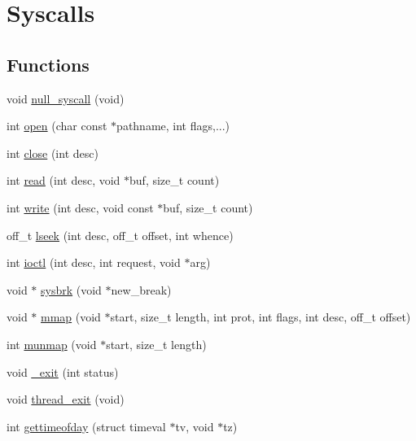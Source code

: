 \hypertarget{group__syscalls}{
\section{Syscalls}
\label{group__syscalls}
}
\subsection*{Functions}
\begin{DoxyCompactItemize}
\item 
void \hyperlink{group__syscalls_ga4430741655c04cf7d609fd935f52a28a}{null\_\-syscall} (void)
\item 
int \hyperlink{group__syscalls_ga0bc065c5cd7178fb88c67a4d02f61deb}{open} (char const $\ast$pathname, int flags,...)
\item 
int \hyperlink{group__syscalls_gab919bda3c5fc0afcf6e3417b840da6e9}{close} (int desc)
\item 
int \hyperlink{group__syscalls_ga709fa54ec765f9f1702f48b43d875a08}{read} (int desc, void $\ast$buf, size\_\-t count)
\item 
int \hyperlink{group__syscalls_ga3b0897fd20782dd7792b88d189e9d4df}{write} (int desc, void const $\ast$buf, size\_\-t count)
\item 
off\_\-t \hyperlink{group__syscalls_gab953b420ed5fc8595d05e52d5bc5a474}{lseek} (int desc, off\_\-t offset, int whence)
\item 
int \hyperlink{group__syscalls_ga546661554019fd9554cf4526305c24fd}{ioctl} (int desc, int request, void $\ast$arg)
\item 
void $\ast$ \hyperlink{group__syscalls_gafdb60e6e9d2dd663e3cc8a13ef796877}{sysbrk} (void $\ast$new\_\-break)
\item 
void $\ast$ \hyperlink{group__syscalls_ga8937a334d42232a0804ed450bb3b8e27}{mmap} (void $\ast$start, size\_\-t length, int prot, int flags, int desc, off\_\-t offset)
\item 
int \hyperlink{group__syscalls_ga559e66a4492a6cb9c6ef5cd07edb8955}{munmap} (void $\ast$start, size\_\-t length)
\item 
void \hyperlink{group__syscalls_gabc96bd69b58b2deaddb484478d911c1b}{\_\-exit} (int status)
\item 
void \hyperlink{group__syscalls_ga87c2438941819bb3cc31658aa9eb66fe}{thread\_\-exit} (void)
\item 
int \hyperlink{group__syscalls_ga2f316a4ad94a242df56b01953677015d}{gettimeofday} (struct timeval $\ast$tv, void $\ast$tz)
\item 

\end{DoxyCompactItemize}
